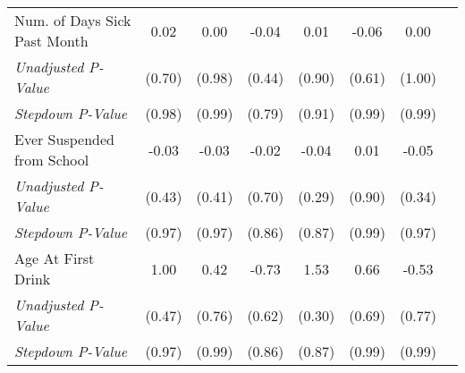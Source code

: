 \begin{tabular}{l c c c c c c c}
Num. of Days Sick Past Month & 0.02 & 0.00 & -0.04 & 0.01 & -0.06 & 0.00 \\
\quad \textit{Unadjusted P-Value} & (0.70) & (0.98) & (0.44) & (0.90) & (0.61) & (1.00) \\
\quad \textit{Stepdown P-Value} & (0.98) & (0.99) & (0.79) & (0.91) & (0.99) & (0.99) \\
Ever Suspended from School & -0.03 & -0.03 & -0.02 & -0.04 & 0.01 & -0.05 \\
\quad \textit{Unadjusted P-Value} & (0.43) & (0.41) & (0.70) & (0.29) & (0.90) & (0.34) \\
\quad \textit{Stepdown P-Value} & (0.97) & (0.97) & (0.86) & (0.87) & (0.99) & (0.97) \\
Age At First Drink & 1.00 & 0.42 & -0.73 & 1.53 & 0.66 & -0.53 \\
\quad \textit{Unadjusted P-Value} & (0.47) & (0.76) & (0.62) & (0.30) & (0.69) & (0.77) \\
\quad \textit{Stepdown P-Value} & (0.97) & (0.99) & (0.86) & (0.87) & (0.99) & (0.99) \\
\bottomrule
\end{tabular}
